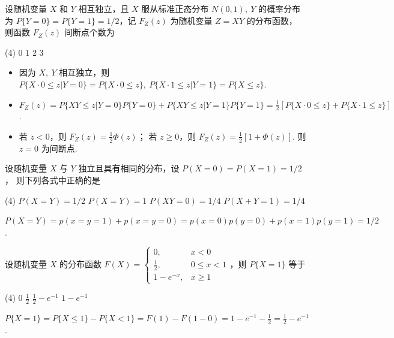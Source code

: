 \begin{problem}
  设随机变量 $X$ 和 $Y$ 相互独立，且 $X$ 服从标准正态分布 $N(0,1),~ Y$ 的概率分布为
  $P\{Y = 0\} = P\{Y = 1\} = 1/2$，记 $F_Z(z)$ 为随机变量 $Z = XY$ 的分布函数，
  则函数 $F_Z(z)$ 间断点个数为
  \begin{tasks}(4)
    \task $0$
    \task[\true] $1$
    \task $2$
    \task $3$
  \end{tasks}
\end{problem}
\scratch[10ex]
\begin{solution}\leavevmode
  \begin{itemize}
    \item 因为 $X,~ Y$ 相互独立，则
    $ P\{X \cdot 0 \leq z | Y = 0\} = P\{X \cdot 0 \leq z\},~
      P\{X \cdot 1 \leq z | Y = 1\} = P\{X \leq z\}$.
    \item $F_Z(z) = P\{XY \leq z | Y = 0\} P\{Y = 0\}
                  + P\{XY \leq z | Y = 1\} P\{Y = 1\}
                  = \frac12 [P\{X \cdot 0 \leq z\} + P\{X \cdot 1 \leq z\}]$.
    \item 若 $z < 0$，则 $F_Z(z) = \frac12 \Phi(z)$；
    若 $z \geq 0$，则 $F_Z(z) = \frac12 [1 + \Phi(z)]$. 则 $z = 0$ 为间断点.
  \end{itemize}
\end{solution}

\begin{problem}
  设随机变量 $X$ 与 $Y$ 独立且具有相同的分布，设 $P(X = 0) = P(X = 1) = 1/2$，
  则下列各式中正确的是
  \begin{tasks}(4)
    \task $P(X = Y) = 1/2$
    \task $P(X = Y) = 1$
    \task $P(XY = 0) = 1/4$
    \task $P(X + Y = 1) = 1/4$
  \end{tasks}
\end{problem}
\scratch[2ex]
\begin{solution}
  $ P(X = Y) = p(x = y = 1) + p(x = y = 0)
  = p(x = 0) p(y = 0) + p(x = 1) p(y = 1) = 1/2$.
\end{solution}

\begin{problem}
  设随机变量 $X$ 的分布函数
  $ F(X) =
    \begin{cases}
      0, & x < 0 \\ \frac12, & 0 \leq x < 1 \\ 1 - e^{-x}, & x \geq 1
    \end{cases}
  $，则 $P\{X = 1\}$ 等于
  \begin{tasks}(4)
    \task $0$
    \task $\frac12$
    \task[\true] $\frac12 - e^{-1}$
    \task $1 - e^{-1}$
  \end{tasks}
\end{problem}
\scratch[2ex]
\begin{solution}
  $ P\{X = 1\} = P\{X \leq 1\} - P\{X < 1\}
  = F(1) - F(1 - 0) = 1 - e^{-1} - \frac12 = \frac12 - e^{-1}$.
\end{solution}

